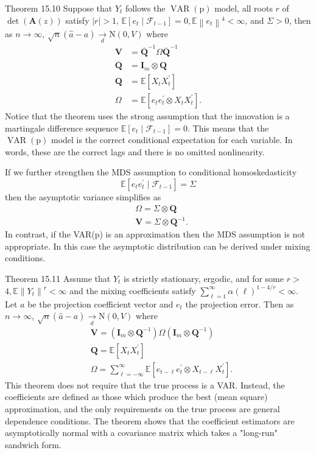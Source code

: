 \documentclass[10pt]{article}
\begin{document}
Theorem 15.10 Suppose that $Y_{t}$ follows the $\operatorname{VAR}(\mathrm{p})$ model, all roots $r$ of $\operatorname{det}(\boldsymbol{A}(z))$ satisfy $|r|>1$, $\mathbb{E}\left[e_{t} \mid \mathscr{F}_{t-1}\right]=0, \mathbb{E}\left\|e_{t}\right\|^{4}<\infty$, and $\Sigma>0$, then as $n \rightarrow \infty$, $\sqrt{n}(\widehat{a}-a) \underset{d}{\longrightarrow} \mathrm{N}(0, V)$ where
$$
\begin{aligned}
\boldsymbol{V} &=\overline{\boldsymbol{Q}}^{-1} \Omega \overline{\boldsymbol{Q}}^{-1} \\
\overline{\boldsymbol{Q}} &=\boldsymbol{I}_{m} \otimes \boldsymbol{Q} \\
\boldsymbol{Q} &=\mathbb{E}\left[X_{t} X_{t}^{\prime}\right] \\
\Omega &=\mathbb{E}\left[e_{t} e_{t}^{\prime} \otimes X_{t} X_{t}^{\prime}\right] .
\end{aligned}
$$
Notice that the theorem uses the strong assumption that the innovation is a martingale difference sequence $\mathbb{E}\left[e_{t} \mid \mathscr{F}_{t-1}\right]=0$. This means that the $\operatorname{VAR}(\mathrm{p})$ model is the correct conditional expectation for each variable. In words, these are the correct lags and there is no omitted nonlinearity.

If we further strengthen the MDS assumption to conditional homoskedasticity
$$
\mathbb{E}\left[e_{t} e_{t}^{\prime} \mid \mathscr{F}_{t-1}\right]=\Sigma
$$
then the asymptotic variance simplifies as
$$
\begin{aligned}
&\Omega=\Sigma \otimes \boldsymbol{Q} \\
&\boldsymbol{V}=\Sigma \otimes \boldsymbol{Q}^{-1} .
\end{aligned}
$$
In contrast, if the VAR(p) is an approximation then the MDS assumption is not appropriate. In this case the asymptotic distribution can be derived under mixing conditions.

Theorem 15.11 Assume that $Y_{t}$ is strictly stationary, ergodic, and for some $r>$ $4, \mathbb{E}\left\|Y_{t}\right\|^{r}<\infty$ and the mixing coefficients satisfy $\sum_{\ell=1}^{\infty} \alpha(\ell)^{1-4 / r}<\infty$. Let $a$ be the projection coefficient vector and $e_{t}$ the projection error. Then as $n \rightarrow \infty$, $\sqrt{n}(\widehat{a}-a) \underset{d}{\longrightarrow} \mathrm{N}(0, V)$ where
$$
\begin{aligned}
&\boldsymbol{V}=\left(\boldsymbol{I}_{m} \otimes \boldsymbol{Q}^{-1}\right) \Omega\left(\boldsymbol{I}_{m} \otimes \boldsymbol{Q}^{-1}\right) \\
&\boldsymbol{Q}=\mathbb{E}\left[X_{t} X_{t}^{\prime}\right] \\
&\Omega=\sum_{\ell=-\infty}^{\infty} \mathbb{E}\left[e_{t-\ell} e_{t}^{\prime} \otimes X_{t-\ell} X_{t}^{\prime}\right] .
\end{aligned}
$$
This theorem does not require that the true process is a VAR. Instead, the coefficients are defined as those which produce the best (mean square) approximation, and the only requirements on the true process are general dependence conditions. The theorem shows that the coefficient estimators are asymptotically normal with a covariance matrix which takes a "long-run" sandwich form.
\end{document}
